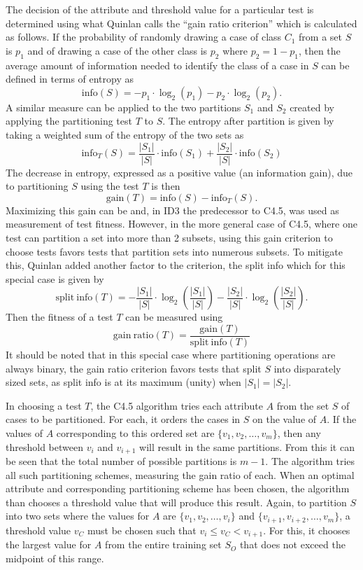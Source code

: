 \documentclass[main.tex]{subfiles}
\begin{document}
The decision of the attribute and threshold value for a particular test is determined using what Quinlan calls the ``gain ratio criterion'' which is calculated as follows. If the probability of randomly drawing a case of class $C_1$ from a set $S$ is $p_1$ and of drawing a case of the other class is $p_2$ where $p_2 = 1-p_1$, then the average amount of information needed to identify the class of a case in $S$ can be defined in terms of entropy as
\[
\mathrm{info}(S)=-p_1 \cdot \log_2(p_1) - p_2 \cdot \log_2(p_2).
\]
A similar measure can be applied to the two partitions $S_1$ and $S_2$ created by applying the partitioning test $T$ to $S$. The entropy after partition is given by taking a weighted sum of the entropy of the two sets as
\[
\mathrm{info}_T(S)=\frac{|S_1|}{|S|} \cdot \mathrm{info}(S_1) + \frac{|S_2|}{|S|} \cdot \mathrm{info}(S_2)
\]
The decrease in entropy, expressed as a positive value (an information gain), due to partitioning $S$ using the test $T$ is then
\[
\mathrm{gain}(T)=\mathrm{info}(S)-\mathrm{info}_T(S).
\]
Maximizing this gain can be and, in ID3 the predecessor to C4.5, was used as measurement of test fitness. However, in the more general case of C4.5, where one test can partition a set into more than 2 subsets, using this gain criterion to choose tests favors tests that partition sets into numerous subsets. To mitigate this, Quinlan added another factor to the criterion, the split info which for this special case is given by
\[
\mathrm{split\ info}(T)= -\frac{|S_1|}{|S|} \cdot \log_2 \left( \frac{|S_1|}{|S|} \right) - \frac{|S_2|}{|S|} \cdot \log_2  \left( \frac{|S_2|}{|S|}  \right).
\]
Then the fitness of a test $T$ can be measured using
\[
\mathrm{gain\ ratio}(T) = \frac{\mathrm{gain}(T)}{\mathrm{split\ info}(T)}
\]
It should be noted that in this special case where partitioning operations are always binary, the gain ratio criterion favors tests that split $S$ into disparately sized sets, as split info is at its maximum (unity) when $|S_1|=|S_2|$.

In choosing a test $T$, the C4.5 algorithm tries each attribute $A$ from the set $S$ of cases to be partitioned. For each, it orders the cases in $S$ on the value of $A$. If the values of $A$ corresponding to this ordered set are $\{v_1,v_2,\ldots,v_m\}$, then any threshold between $v_i$ and $v_{i+1}$ will result in the same partitions. From this it can be seen that the total number of possible partitions is $m-1$. The algorithm tries all such partitioning schemes, measuring the gain ratio of each. When an optimal attribute and corresponding partitioning scheme has been chosen, the algorithm than chooses a threshold value that will produce this result. Again, to partition $S$ into two sets where the values for $A$ are $\{v_1,v_2,\ldots,v_i\}$ and $\{v_{i+1},v_{i+2},\ldots,v_m\}$, a threshold value $v_C$ must be chosen such that $v_i \leq v_C < v_{i+1}$. For this, it chooses the largest value for $A$ from the entire training set $S_O$ that does not exceed the midpoint of this range. 


\biblio
\end{document}
